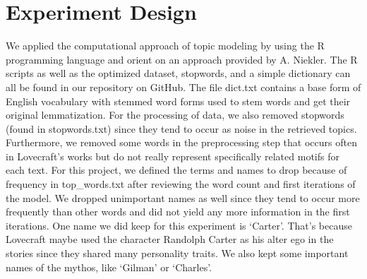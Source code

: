 \section{Experiment Design}

We applied the computational approach of topic modeling by using the R programming language and 
orient on an approach provided by A. Niekler. The R scripts as well as the optimized dataset, 
stopwords, and a simple dictionary can all be found in our repository on GitHub. The file dict.txt 
contains a base form of English vocabulary with stemmed word forms used to stem words and get their 
original lemmatization. For the processing of data, we also removed stopwords (found in stopwords.txt) 
since they tend to occur as noise in the retrieved topics. Furthermore, we removed some words in the 
preprocessing step that occurs often in Lovecraft’s works but do not really represent specifically 
related motifs for each text. For this project, we defined the terms and names to drop because of 
frequency in top\_words.txt after reviewing the word count and first iterations of the model. We 
dropped unimportant names as well since they tend to occur more frequently than other words and 
did not yield any more information in the first iterations. One name we did keep for this experiment 
is ‘Carter’. That’s because Lovecraft maybe used the character Randolph Carter as his alter ego in 
the stories since they shared many personality traits. We also kept some important names of the 
mythos, like ‘Gilman’ or ‘Charles’.\\

